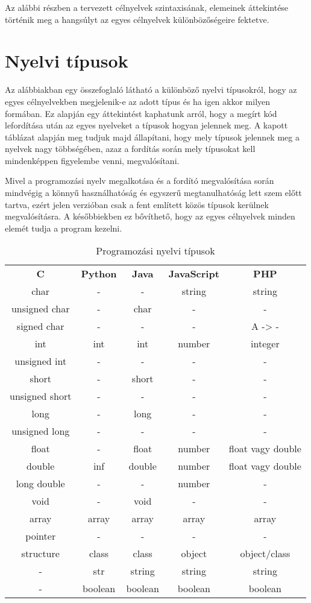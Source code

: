
Az alábbi részben a tervezett célnyelvek szintaxisának, elemeinek áttekintése történik meg a hangsúlyt az egyes célnyelvek különbözőségeire fektetve.

\section{Nyelvi típusok}

Az alábbiakban egy összefoglaló látható a különböző nyelvi típusokról, hogy az egyes célnyelvekben megjelenik-e az adott típus és ha igen akkor milyen formában. Ez alapján egy áttekintést kaphatunk arról, hogy a megírt kód lefordítása után az egyes nyelveket a típusok hogyan jelennek meg.
A kapott táblázat alapján meg tudjuk majd állapítani, hogy mely típusok jelennek meg a nyelvek nagy többségében, azaz a fordítás során mely típusokat kell mindenképpen figyelembe venni, megvalósítani.

Mivel a programozási nyelv megalkotása és a fordító megvalósítása során mindvégig a könnyű használhatóság és egyszerű megtanulhatóság lett szem előtt tartva, ezért jelen verzióban csak a fent említett közös típusok kerülnek megvalósításra. A későbbiekben ez bővíthető, hogy az egyes célnyelvek minden elemét tudja a program kezelni.

\begin{table}
	\caption{Programozási nyelvi típusok}
	\label{2. táblázat}
	\begin{tabular}{c|c|c|c|c}
		\textbf{C} & \textbf{Python} & \textbf{Java} & \textbf{JavaScript} & \textbf{PHP}\\
		char & - & - & string & string \\
		unsigned char & - & char & - & - \\
		signed char & - & - & - & A -> - \\
		int & int & int & number & integer \\
		unsigned int & - & - & - & - \\
		short & - & short & - & - \\
		unsigned short & - & - & - & - \\
		long & - & long & - & - \\
		unsigned long & - & - & - & - \\
		float & - & float & number & float vagy double \\
		double & inf & double & number & float vagy double \\
		long double & - & - & number & - \\
		void & - & void & - & - \\
		array & array & array & array & array \\
		pointer & - & - & - & - \\
		structure & class & class & object & object/class \\
		- & str & string & string & string \\
		- & boolean & boolean & boolean & boolean \\
	\end{tabular}
\end{table}

